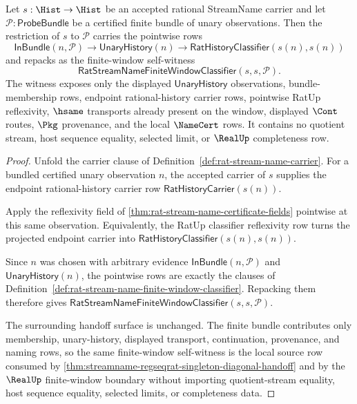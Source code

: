 \begin{theorem}
\label{thm:streamname-finite-window-pointwise-reflexivity}
Let $s:\Hist\to\Hist$ be an accepted rational StreamName carrier and let
$\mathcal{P}:\mathsf{ProbeBundle}$ be a certified finite bundle of unary
observations. Then the restriction of $s$ to $\mathcal{P}$ carries the
pointwise rows
$$
\mathsf{InBundle}(n,\mathcal{P})\to
\mathsf{UnaryHistory}(n)\to
\mathsf{RatHistoryClassifier}(s(n),s(n))
$$
and repacks as the finite-window self-witness
$$
\mathsf{RatStreamNameFiniteWindowClassifier}(s,s,\mathcal{P}).
$$
The witness exposes only the displayed $\mathsf{UnaryHistory}$ observations,
bundle-membership rows, endpoint rational-history carrier rows, pointwise
RatUp reflexivity, $\hsame$ transports already present on the window,
displayed $\Cont$ routes, $\Pkg$ provenance, and the local $\NameCert$ rows.
It contains no quotient stream, host sequence equality, selected limit, or
$\RealUp$ completeness row.
\end{theorem}
\begin{proof}
Unfold the carrier clause of Definition~\ref{def:rat-stream-name-carrier}.
For a bundled certified unary observation $n$, the accepted carrier of $s$
supplies the endpoint rational-history carrier row
$\mathsf{RatHistoryCarrier}(s(n))$.

Apply the reflexivity field of
\autoref{thm:rat-stream-name-certificate-fields} pointwise at this same
observation. Equivalently, the RatUp classifier reflexivity row turns the
projected endpoint carrier into
$\mathsf{RatHistoryClassifier}(s(n),s(n))$.

Since $n$ was chosen with arbitrary evidence
$\mathsf{InBundle}(n,\mathcal{P})$ and $\mathsf{UnaryHistory}(n)$, the
pointwise rows are exactly the clauses of
Definition~\ref{def:rat-stream-name-finite-window-classifier}. Repacking them
therefore gives
$\mathsf{RatStreamNameFiniteWindowClassifier}(s,s,\mathcal{P})$.

The surrounding handoff surface is unchanged. The finite bundle contributes
only membership, unary-history, displayed transport, continuation, provenance,
and naming rows, so the same finite-window self-witness is the local source
row consumed by
\autoref{thm:streamname-regseqrat-singleton-diagonal-handoff} and by the
$\RealUp$ finite-window boundary without importing quotient-stream equality,
host sequence equality, selected limits, or completeness data.
\end{proof}

